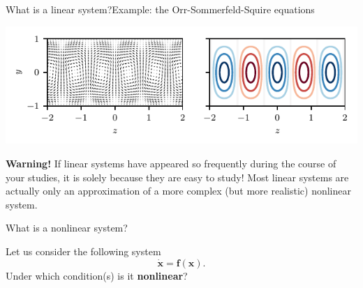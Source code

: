 \documentclass[usenames,dvipsnames,svgnames,10pt,aspectratio=169]{beamer}
\begin{document}
\begin{frame}[t, c]{What is a linear system?}{Example: the Orr-Sommerfeld-Squire equations}
\begin{minipage}{.38\textwidth}
		\bigskip

		\hspace{-2.5cm} \includegraphics[width=1.5\textwidth]{S2_optimal_perturbation_couette_flow}
	\end{minipage}

	\vspace{1cm}
\end{frame}

\begin{frame}[t, c]{}{}
	\begin{block}{\centering \textbf{Warning!}}
		If linear systems have appeared so frequently during the course of your studies, it is solely because they are easy to study!
		Most linear systems are actually only an approximation of a more complex (but more realistic) nonlinear system.
	\end{block}
\end{frame}

\begin{frame}[t, c]{What is a nonlinear system?}{}
	\centering

	\begin{block}{}
		\centering
		Let us consider the following system
		\[
			\dot{\bm x} = {\bm f}({\bm x}).
		\]
		Under which condition(s) is it \alert{\textbf{nonlinear}}?
	\end{block}

	\vspace{1cm}
\end{frame}
\end{document}
